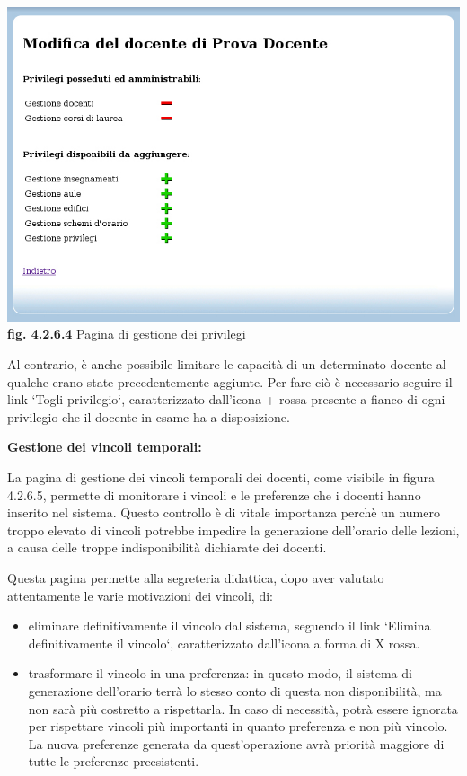 \documentclass[11pt,a4paper]{article}
\begin{document}
\bigskip
\begin{center}
	\includegraphics[scale=0.5]{images/gestione_privilegi.jpg}\\
	\textbf{fig. 4.2.6.4} Pagina di gestione dei privilegi\\
\end{center}
\bigskip

Al contrario, è anche possibile limitare le capacità di un determinato docente al qualche erano state precedentemente aggiunte. Per fare ciò è necessario seguire il link `Togli privilegio`, caratterizzato dall'icona + rossa presente a fianco di ogni privilegio che il docente in esame ha a disposizione.
\newline \newline
\begin{large}\textbf{Gestione dei vincoli temporali:}\end{large}
\newline \newline
La pagina di gestione dei vincoli temporali dei docenti, come visibile in figura 4.2.6.5, permette di monitorare i vincoli e le preferenze che i docenti hanno inserito nel sistema. Questo controllo è di vitale importanza perchè un numero troppo elevato di vincoli potrebbe impedire la generazione dell'orario delle lezioni, a causa delle troppe indisponibilità dichiarate dei docenti.

Questa pagina permette alla segreteria didattica, dopo aver valutato attentamente le varie motivazioni dei vincoli, di:
\begin{itemize}
 \item eliminare definitivamente il vincolo dal sistema, seguendo il link `Elimina definitivamente il vincolo`, caratterizzato dall'icona a forma di X rossa.
 \item trasformare il vincolo in una preferenza: in questo modo, il sistema di generazione dell'orario terrà lo stesso conto di questa non disponibilità, ma non sarà più costretto a rispettarla. In caso di necessità, potrà essere ignorata per rispettare vincoli più importanti in quanto preferenza e non più vincolo. La nuova preferenze generata da quest'operazione avrà priorità maggiore di tutte le preferenze preesistenti.
\end{itemize}
\end{document}
